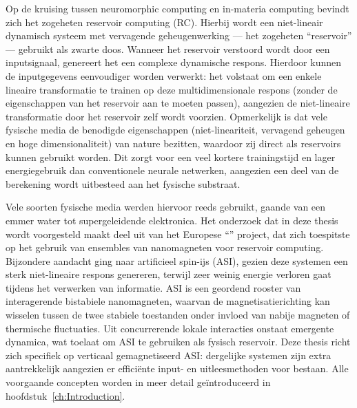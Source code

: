 Op de kruising tussen neuromorphic computing en in-materia computing bevindt zich het zogeheten reservoir computing (RC).
Hierbij wordt een niet-lineair dynamisch systeem met vervagende geheugenwerking --- het zogeheten ``reservoir'' --- gebruikt als zwarte doos.
Wanneer het reservoir verstoord wordt door een inputsignaal, genereert het een complexe dynamische respons.
Hierdoor kunnen de inputgegevens eenvoudiger worden verwerkt: het volstaat om een enkele lineaire transformatie te trainen op deze multidimensionale respons (zonder de eigenschappen van het reservoir aan te moeten passen), aangezien de niet-lineaire transformatie door het reservoir zelf wordt voorzien. 
Opmerkelijk is dat vele fysische media de benodigde eigenschappen (niet-lineariteit, vervagend geheugen en hoge dimensionaliteit) van nature bezitten, waardoor zij direct als reservoirs kunnen gebruikt worden.
Dit zorgt voor een veel kortere trainingstijd en lager energiegebruik dan conventionele neurale netwerken, aangezien een deel van de berekening wordt uitbesteed aan het fysische substraat. \par
Vele soorten fysische media werden hiervoor reeds gebruikt, gaande van een emmer water tot supergeleidende elektronica.
Het onderzoek dat in deze thesis wordt voorgesteld maakt deel uit van het Europese ``\spinengine'' project, dat zich toespitste op het gebruik van ensembles van nanomagneten voor reservoir computing.
Bijzondere aandacht ging naar artificieel spin-ijs (ASI), gezien deze systemen een sterk niet-lineaire respons genereren, terwijl zeer weinig energie verloren gaat tijdens het verwerken van informatie.
ASI is een geordend rooster van interagerende bistabiele nanomagneten, waarvan de magnetisatierichting kan wisselen tussen de twee stabiele toestanden onder invloed van nabije magneten of thermische fluctuaties.
Uit concurrerende lokale interacties onstaat emergente dynamica, wat toelaat om ASI te gebruiken als fysisch reservoir.
Deze thesis richt zich specifiek op verticaal gemagnetiseerd ASI: dergelijke systemen zijn extra aantrekkelijk aangezien er effici\"ente input- en uitleesmethoden voor bestaan.
Alle voorgaande concepten worden in meer detail ge\"introduceerd in hoofdstuk~\ref{ch:Introduction}. \\

